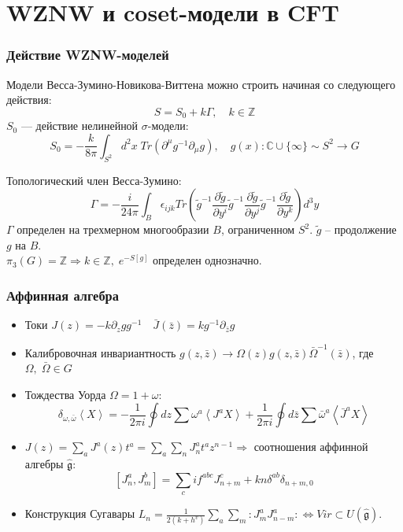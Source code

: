 \documentclass[pdftex]{beamer}
\newcommand{\gfh}{\hat{\mathfrak{g}}}
\theoremstyle{definition} \newtheorem{Def}{Определение}
\begin{document}
\section{WZNW и coset-модели в CFT }
\begin{frame}
  \frametitle{Действие WZNW-моделей}
  Модели Весса-Зумино-Новикова-Виттена можно строить начиная со следующего действия:
  \begin{equation}
    \label{eq:4}
    S=S_0+k\Gamma, \quad k\in \mathbb{Z}
  \end{equation}
 $S_0$ --- действие нелинейной $\sigma$-модели:
\begin{equation}
  \label{eq:5}
  S_0=-\frac{k}{8\pi}\int_{S^2} d^2x\; Tr (\partial^{\mu}g^{-1}\partial_{\mu}g),\quad g(x):\mathbb{C}\cup \{\infty\}\sim S^{2}\to G 
\end{equation}

Топологический член Весса-Зумино:
\begin{equation}
  \label{eq:73}
\Gamma= - \frac{i }{24\pi} \int_{B}\epsilon_{ijk} Tr\left(
    \tilde g^{-1}\frac{\partial \tilde g}{\partial y^i}
      \tilde g^{-1}\frac{\partial \tilde g}{\partial y^j}
      \tilde g^{-1}\frac{\partial \tilde g}{\partial y^k}\right) d^3y
\end{equation}
$\Gamma$ определен на трехмерном многообразии $B$, ограниченном $S^{2}$. $\tilde{g}$  -- продолжение $g$ на $B$.\\
$\pi_{3}(G)=\mathbb{Z} \Rightarrow k\in\mathbb{Z}, \; e^{-S[g]}$ определен однозначно.

\end{frame}
\begin{frame}
  \frametitle{Аффинная алгебра}

  \begin{itemize}
  \item   Токи 
    $J(z)= -k \partial_zg g^{-1}\quad \bar J(\bar z)=k g^{-1}\partial_{\bar z}g$

  \item Калибровочная инвариантность $   g(z,\bar z)\to \Omega(z)g(z,\bar z)\bar \Omega^{-1}(\bar z)$,
    где $\Omega,\;\bar \Omega \in G$

  \item Тождества Уорда $\Omega=1+\omega$:
    \begin{equation*}
      \label{eq:87}
      \delta_{\omega,\bar \omega}\left< X \right>=-\frac{1}{2\pi i}\oint dz \sum\omega^a \left< J^a X\right>+
      \frac{1}{2\pi i} \oint d\bar z \sum \bar \omega^a \left< \bar J^a X\right>
    \end{equation*}
  \item  $J(z)=\sum_{a} J^{a}(z) t^{a}=\sum_{a} \sum _{n} J^{a}_{n} t^{a} z^{n-1} \Rightarrow$ соотношения аффинной алгебры $\gfh$: 
    \begin{equation*}
      \left[J^a_n,J^b_m\right]=\sum_c i f^{abc}J^c_{n+m}+kn\delta^{ab}\delta_{n+m,0}
    \end{equation*}
  \item Конструкция Сугавары $  L_n=\frac{1}{2(k+h^v)}\sum\limits_a\sum\limits_m:J^a_m J^a_{n-m}: \Leftrightarrow Vir\subset U(\gfh)$.
  \end{itemize}
\end{frame}
\end{document}
